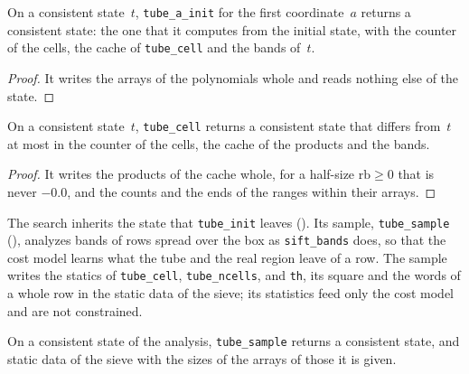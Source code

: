 \begin{lemma}\label{lem:tubeAInit_spec}
  \leanok
  On a consistent state~$t$, \texttt{tube\_a\_init} for the first coordinate~$a$ returns a
  consistent state: the one that it computes from the initial state, with the counter of the cells,
  the cache of \texttt{tube\_cell} and the bands of~$t$.
\end{lemma}

\begin{proof}
  \leanok
  It writes the arrays of the polynomials whole and reads nothing else of the state.
\end{proof}

\begin{lemma}\label{lem:tubeCell_spec}
  \leanok
  On a consistent state~$t$, \texttt{tube\_cell} returns a consistent state that differs from~$t$
  at most in the counter of the cells, the cache of the products and the bands.
\end{lemma}

\begin{proof}
  \leanok
  It writes the products of the cache whole, for a half-size $\mathrm{rb} \ge 0$ that is never
  $-0.0$, and the counts and the ends of the ranges within their arrays.
\end{proof}

The search inherits the state that \texttt{tube\_init} leaves ().
Its sample, \texttt{tube\_sample} (), analyzes bands of rows spread
over the box as \texttt{sift\_bands} does, so that the cost model learns what the tube and the real
region leave of a row. The sample writes the statics of
\texttt{tube\_cell}, \texttt{tube\_ncells}, and \texttt{th}, its square and the words of a whole
row in the static data of the sieve; its statistics feed only the cost model and are not
constrained.

\begin{lemma}\label{lem:tubeSample_spec}
  \leanok
  On a consistent state of the analysis, \texttt{tube\_sample} returns a consistent state, and
  static data of the sieve with the sizes of the arrays of those it is given.
\end{lemma}

